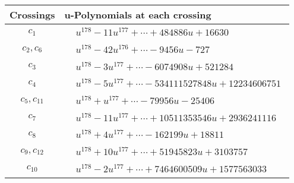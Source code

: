 \documentclass[1p]{elsarticle_modified}
\theoremstyle{definition}
\begin{document}
\begin{tabular}{m{50pt}|m{274pt}}
Crossings & \hspace{64pt}u-Polynomials at each crossing \\
\hline $$\begin{aligned}c_{1}\end{aligned}$$&$\begin{aligned}
&u^{178}-11 u^{177}+\cdots+484886 u+16630
\end{aligned}$\\
\hline $$\begin{aligned}c_{2},c_{6}\end{aligned}$$&$\begin{aligned}
&u^{178}-42 u^{176}+\cdots-9456 u-727
\end{aligned}$\\
\hline $$\begin{aligned}c_{3}\end{aligned}$$&$\begin{aligned}
&u^{178}-3 u^{177}+\cdots-6074908 u+521284
\end{aligned}$\\
\hline $$\begin{aligned}c_{4}\end{aligned}$$&$\begin{aligned}
&u^{178}-5 u^{177}+\cdots-534111527848 u+12234606751
\end{aligned}$\\
\hline $$\begin{aligned}c_{5},c_{11}\end{aligned}$$&$\begin{aligned}
&u^{178}+u^{177}+\cdots-79956 u-25406
\end{aligned}$\\
\hline $$\begin{aligned}c_{7}\end{aligned}$$&$\begin{aligned}
&u^{178}-11 u^{177}+\cdots+10511353546 u+2936241116
\end{aligned}$\\
\hline $$\begin{aligned}c_{8}\end{aligned}$$&$\begin{aligned}
&u^{178}+4 u^{177}+\cdots-162199 u+18811
\end{aligned}$\\
\hline $$\begin{aligned}c_{9},c_{12}\end{aligned}$$&$\begin{aligned}
&u^{178}+10 u^{177}+\cdots+51945823 u+3103757
\end{aligned}$\\
\hline $$\begin{aligned}c_{10}\end{aligned}$$&$\begin{aligned}
&u^{178}-2 u^{177}+\cdots+7464600509 u+1577563033
\end{aligned}$\\
\hline
\end{tabular}\\~\\
\end{document}
